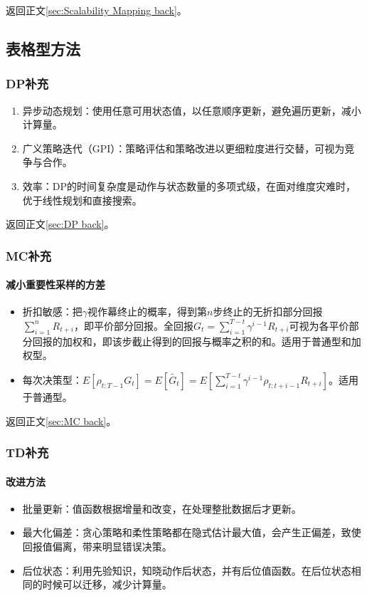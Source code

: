 \documentclass[
12pt, %
a4paper, 
oneside, %
]{scrartcl}
\begin{document}
{返回正文\ref{sec:Scalability Mapping back}。
\subsection[表格型方法]{表格型方法}
\subsubsection[DP补充]{DP补充}\label{sec:DP}
\begin{enumerate}
\item 异步动态规划：使用任意可用状态值，以任意顺序更新，避免遍历更新，减小计算量。
\item 广义策略迭代（GPI）：策略评估和策略改进以更细粒度进行交替，可视为竞争与合作。
\item 效率：DP的时间复杂度是动作与状态数量的多项式级，在面对维度灾难时，优于线性规划和直接搜索。
\end{enumerate}

返回正文\ref{sec:DP back}。
\subsubsection[MC补充]{MC补充}
\paragraph{减小重要性采样的方差}\label{sec:MC}
\begin{itemize}
\item 折扣敏感：把$ \gamma $视作幕终止的概率，得到第$ n $步终止的无折扣部分回报$ \sum_{i = 1}^n R_{t + i} $，即平价部分回报。全回报$ G_t = \sum_{i = 1}^{T - t} \gamma^{i - 1}R_{t + i} $可视为各平价部分回报的加权和，即该步截止得到的回报与概率之积的和。适用于普通型和加权型。
\item 每次决策型：$ E[\rho_{t:T - 1}G_t] = E[\tilde{G_t}] = E[\sum_{i = 1}^{T - t} \gamma^{i - 1} \rho_{t:t + i - 1}R_{t + i}] $。适用于普通型。
\end{itemize}

返回正文\ref{sec:MC back}。
\subsubsection[TD补充]{TD补充}\label{sec:TD}
\paragraph{改进方法}
\begin{itemize}
\item 批量更新：值函数根据增量和改变，在处理整批数据后才更新。
\item 最大化偏差：贪心策略和柔性策略都在隐式估计最大值，会产生正偏差，致使回报值偏离，带来明显错误决策。
\item 后位状态：利用先验知识，知晓动作后状态，并有后位值函数。在后位状态相同的时候可以迁移，减少计算量。
\end{itemize}
}
\end{document}
